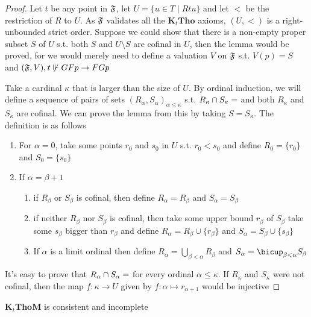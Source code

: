 \documentclass[11pt]{article}
\newcommand{\KtTho}{\textbf{K}_t\textbf{Tho}}
\newcommand{\KtThoM}{\textbf{K}_t\textbf{ThoM}}
\begin{document}
\begin{proof}
Let \(t\) be any point in \(\mathfrak{F}\), let \(U=\{u\in T\mid Rtu\}\) and let \(<\)
be the restriction of \(R\) to \(U\). As \(\mathfrak{F}\) validates all the \(\KtTho\)
axioms, \((U,<)\) is a right-unbounded strict order. Suppose we could show
that there is a non-empty proper subset \(S\) of \(U\) s.t. both \(S\) and
\(U\setminus S\) are cofinal in \(U\), then the lemma would be proved, for we
would merely need to define a valuation \(V\) on \(\mathfrak{F}\) s.t. \(V(p)=S\) and
\((\mathfrak{F},V),t\not\Vdash GFp\to FGp\)

Take a cardinal \(\kappa\) that is larger than the size of \(U\). By ordinal
induction, we will define a sequence of pairs of sets
\((R_\alpha,S_\alpha)_{\alpha\le\kappa}\) s.t. \(R_\kappa\cap
   S_\kappa=\empty\) and both \(R_\kappa\) and \(S_\kappa\) are cofinal. We can
prove the lemma from this by taking \(S=S_\kappa\). The definition is as
follows
\begin{enumerate}
\item For \(\alpha=0\), take some points \(r_0\) and \(s_0\) in \(U\) s.t.
\(r_0<s_0\) and define \(R_0=\{r_0\}\) and \(S_0=\{s_0\}\)
\item If \(\alpha=\beta+1\)
\begin{enumerate}
\item if \(R_\beta\) or \(S_\beta\) is cofinal, then define
\(R_\alpha=R_\beta\) and \(S_\alpha=S_\beta\)
\item if neither \(R_\beta\) nor \(S_\beta\) is cofinal, then take some upper
bound \(r_\beta\) of \(S_\beta\) take some \(s_\beta\) bigger than
\(r_\beta\) and define \(R_\alpha=R_\beta\cup\{r_\beta\}\) and \(S_\alpha=S_\beta\cup\{s_\beta\}\)
\item If \(\alpha\) is a limit ordinal then define \(R_\alpha=\bigcup_{\beta<\alpha}R_\beta\)
and \(S_\alpha=\bicup_{\beta<\alpha}S_\beta\)
\end{enumerate}
\end{enumerate}


It's easy to prove that \(R_\alpha\cap S_\alpha=\empty\) for every ordinal
\(\alpha\le\kappa\). If \(R_\kappa\) and \(S_\kappa\) were not cofinal, then
the map \(f:\kappa\to U\) given by \(f:\alpha\mapsto r_{\alpha+1}\) would be injective
\end{proof}

\begin{theorem}[]
\(\KtThoM\) is consistent and incomplete
\end{theorem}
\end{document}
